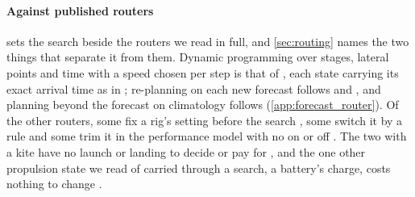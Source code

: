 
\paragraph{Against published routers}  sets the search beside the routers we read in full, and \cref{sec:routing} names the two things that separate it from them. Dynamic programming over stages, lateral points and time with a speed chosen per step is that of \citet{wei2012}, each state carrying its exact arrival time as in \citet{shao2012}; re-planning on each new forecast follows \citet{hagiwara1989} and \citet{mason2023}, and planning beyond the forecast on climatology follows \citet{hagiwara1989} (\cref{app:forecast_router}). Of the other routers, some fix a rig's setting before the search \citep{mannarini2024,wendling2025}, some switch it by a rule \citep{mason2023,kytariolou2026} and some trim it in the performance model with no on or off \citep{hagiwara1989,sun2022,dhainaut2025}. The two with a kite have no launch or landing to decide or pay for \citep{bentin2018,leskinen2024}, and the one other propulsion state we read of carried through a search, a battery's charge, costs nothing to change \citep{gangnant2026}.

